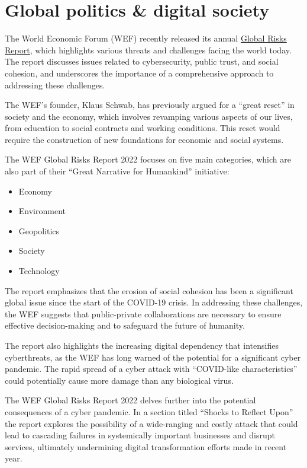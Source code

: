 \section{Global politics \& digital society}
The World Economic Forum (WEF) recently released its annual \href{https://www3.weforum.org/docs/WEF_The_Global_Risks_Report_2022.pdf}{Global Risks Report}, which highlights various threats and challenges facing the world today. The report discusses issues related to cybersecurity, public trust, and social cohesion, and underscores the importance of a comprehensive approach to addressing these challenges.\par
The WEF's founder, Klaus Schwab, has previously argued for a ``great reset'' in society and the economy, which involves revamping various aspects of our lives, from education to social contracts and working conditions. This reset would require the construction of new foundations for economic and social systems.\par 
The WEF Global Risks Report 2022 focuses on five main categories, which are also part of their ``Great Narrative for Humankind'' initiative:
\begin{itemize}
\item Economy
\item Environment
\item Geopolitics
\item Society
\item Technology
\end{itemize}
The report emphasizes that the erosion of social cohesion has been a significant global issue since the start of the COVID-19 crisis. In addressing these challenges, the WEF suggests that public-private collaborations are necessary to ensure effective decision-making and to safeguard the future of humanity.\par
The report also highlights the increasing digital dependency that intensifies cyberthreats, as the WEF has long warned of the potential for a significant cyber pandemic. The rapid spread of a cyber attack with ``COVID-like characteristics'' could potentially cause more damage than any biological virus.\par
The WEF Global Risks Report 2022 delves further into the potential consequences of a cyber pandemic. In a section titled ``Shocks to Reflect Upon'' the report explores the possibility of a wide-ranging and costly attack that could lead to cascading failures in systemically important businesses and disrupt services, ultimately undermining digital transformation efforts made in recent year.\par
